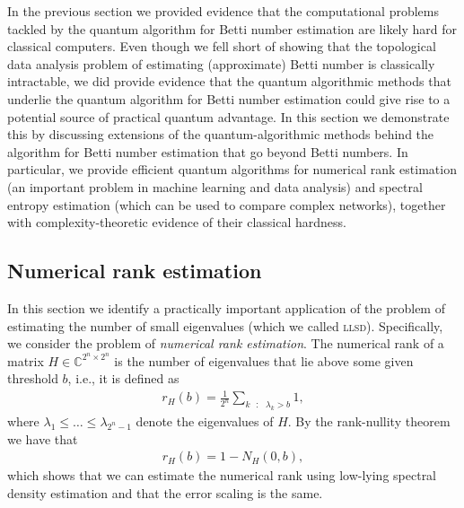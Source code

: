 \documentclass[a4paper, onecolumn, accepted=2022-08-28]{quantumarticle}
\begin{document}
In the previous section we provided evidence that the computational problems tackled by the quantum algorithm for Betti number estimation are likely hard for classical computers.
Even though we fell short of showing that the topological data analysis problem of estimating (approximate) Betti number is classically intractable, we did provide evidence that the quantum algorithmic methods that underlie the quantum algorithm for Betti number estimation could give rise to a potential source of practical quantum advantage.
In this section we demonstrate this by discussing extensions of the quantum-algorithmic methods behind the algorithm for Betti number estimation that go beyond Betti numbers.
In particular, we provide efficient quantum algorithms for numerical rank estimation (an important problem in machine learning and data analysis) and spectral entropy estimation (which can be used to compare complex networks), together with complexity-theoretic evidence of their classical hardness.

\subsection{Numerical rank estimation
  \label{subsec:numerical_rank_estimation}}

In this section we identify a practically important application of the problem of estimating the number of small eigenvalues (which we called \textsc{llsd}).
Specifically, we consider the problem of \emph{numerical rank estimation}. 
The numerical rank of a matrix $H \in \mathbb{C}^{2^n \times 2^n}$ is the number of eigenvalues that lie above some given threshold $b$, i.e., it is defined as
\begin{align*}
    r_H(b) = \frac{1}{2^n}\sum_{k\text{ }:\text{ }\lambda_k > b} 1,    
\end{align*}
where $\lambda_1 \leq \dots \leq \lambda_{2^{n}-1}$ denote the eigenvalues of $H$.
By the rank-nullity theorem we have that 
\begin{align*}
r_H(b) = 1 - N_H(0, b),
\end{align*}
which shows that we can estimate the numerical rank using low-lying spectral density estimation and that the error scaling is the same.
\end{document}
